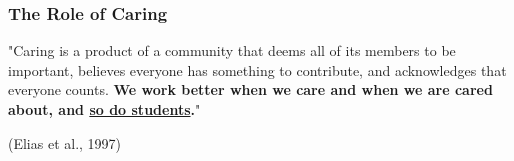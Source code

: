 \documentclass[aspectratio=169]{beamer}
\newcommand{\tBold}[1]{\textcolor{FSUred}{\textbf{#1}}}
\begin{document}
	\begin{frame}
		\frametitle{\textsf{The Role of Caring}}
		\Large "Caring is a product of a community that deems all of its members to be important, believes everyone has something to contribute, and acknowledges that everyone counts. \tBold{We work better when we care and when we are cared about, and \underline{so do students}.}" \normalsize
		\vspace{2em}
				\begin{flushright}
					\tiny (Elias et al., 1997)
				\end{flushright}
	\end{frame}
\end{document}
